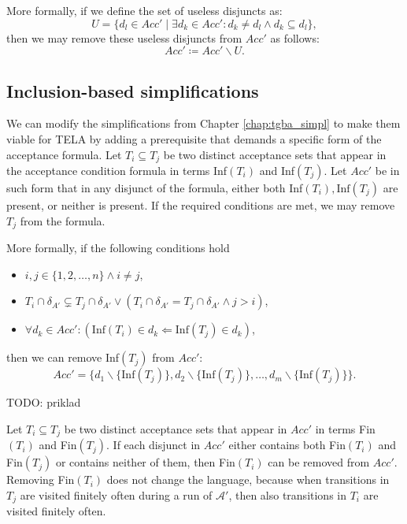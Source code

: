\documentclass[
  digital, %
  twoside, %
  table,   %
  lof,     %
  lot,     %
]{fithesis3}
\begin{document}
More formally, if we define the set of useless disjuncts as:
\begin{equation*}
  U = \{d_l \in Acc' \mid \exists d_k \in Acc' \colon d_k \neq d_l \wedge d_k \subseteq d_l\},
\end{equation*}
then we may remove these useless disjuncts from $Acc'$ as follows:
\begin{equation*}
  Acc' \coloneqq Acc' \smallsetminus U.
\end{equation*}

\subsection{Inclusion-based simplifications}
We can modify the simplifications from Chapter \ref{chap:tgba_simpl} to make them viable for TELA by adding a prerequisite that demands a specific form of the acceptance formula. Let $T_i \subseteq T_j$ be two distinct acceptance sets that appear in the acceptance condition formula in terms Inf$(T_i)$ and Inf$(T_j)$. Let $Acc'$ be in such form that in any disjunct of the formula, either both Inf$(T_i), \text{Inf}(T_j)$ are present, or neither is present. If the required conditions are met, we may remove $T_j$ from the formula. 

More formally, if the following conditions hold
\begin{itemize}
  \item $i, j \in \{1, 2, \dots, n\} \wedge i \neq j$,
  \item $T_i \cap \delta_{A'} \subsetneq T_j \cap \delta_{A'} \vee (T_i \cap \delta_{A'} = T_j \cap \delta_{A'} \wedge j > i)$,
  \item $\forall d_k \in Acc' \colon (\text{Inf}(T_i) \in d_k \Leftarrow \text{Inf}(T_j) \in d_k)$,
\end{itemize}
then we can remove Inf$(T_j)$ from $Acc'$: 
\begin{equation*}
  Acc' = \{d_1 \smallsetminus \{\text{Inf}(T_j)\}, d_2 \smallsetminus \{\text{Inf}(T_j)\}, \dots, d_m \smallsetminus \{\text{Inf}(T_j)\}\}.
\end{equation*} 

TODO: priklad

Let $T_i \subseteq T_j$ be two distinct acceptance sets that appear in $Acc'$ in terms Fin$(T_i)$ and Fin$(T_j)$. If each disjunct in $Acc'$ either contains both Fin$(T_i)$ and Fin$(T_j)$ or contains neither of them, then Fin$(T_i)$ can be removed from $Acc'$.  Removing Fin$(T_i)$ does not change the language, because when transitions in $T_j$ are visited finitely often during a run of $\mathcal{A'}$, then also transitions in $T_i$ are visited finitely often. 
\end{document}
